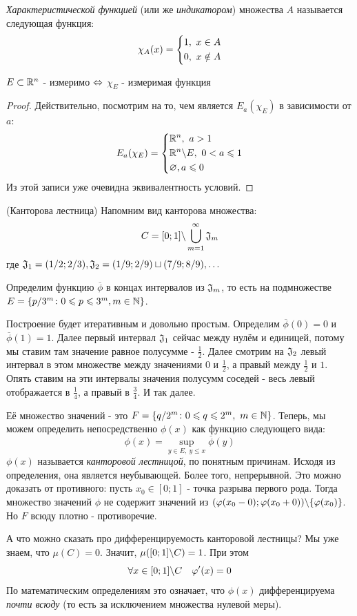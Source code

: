 \begin{definition}
	\textit{Характеристической функцией} (или же \textit{индикатором}) множества $A$ называется следующая функция:
	\[
		\chi_A(x) = \left\{\begin{aligned}
			&{1,\ x \in A}
			\\
			&{0,\ x \notin A}
		\end{aligned}\right.
	\]
\end{definition}

\begin{proposition}
	$E \subset \mathbb{R}^n$ - измеримо $\Leftrightarrow$ $\chi_E$ - измеримая функция
\end{proposition}

\begin{proof}
	Действительно, посмотрим на то, чем является $E_a(\chi_E)$ в зависимости от $a$:
	\[
		E_a(\chi_E) = \left\{\begin{aligned}
			&{\mathbb{R}^n,\ a > 1}
			\\
			&{\mathbb{R}^n \backslash E,\ 0 < a \leqslant 1}
			\\
			&{\varnothing, a \leqslant 0}
		\end{aligned}\right.
	\]
	Из этой записи уже очевидна эквивалентность условий.
\end{proof}

\begin{example} (Канторова лестница)
	Напомним вид канторова множества:
	\[
		C = [0; 1] \backslash \bigcup_{m = 1}^\infty \mathfrak{J}_m
	\]
	где $\mathfrak{J}_1 = (1/2; 2/3), \mathfrak{J}_2 = (1/9; 2/9) \sqcup (7/9; 8/9), \ldots$
	
	Определим функцию $\overline{\phi}$ в концах интервалов из $\mathfrak{J}_m$, то есть на подмножестве $E = \{p/3^m \colon 0 \leqslant p \leqslant 3^m, m \in \mathbb{N}\}$.
	
	Построение будет итеративным и довольно простым. Определим $\overline{\phi}(0) = 0$ и $\overline{\phi}(1) = 1$. Далее первый интервал $\mathfrak{J}_1$ сейчас между нулём и единицей, потому мы ставим там значение равное полусумме - $\frac{1}{2}$. Далее смотрим на $\mathfrak{J}_2$ левый интервал в этом множестве между значениями $0$ и $\frac{1}{2}$, а правый между $\frac{1}{2}$ и $1$. Опять ставим на эти интервалы значения полусумм соседей - весь левый отображается в $\frac{1}{4}$, а правый в $\frac{3}{4}$. И так далее.
	
	Её множество значений - это $F = \{q / 2^m \colon 0 \leqslant q \leqslant 2^m,\ m \in \mathbb{N}\}$. Теперь, мы можем определить непосредственно $\phi(x)$ как функцию следующего вида:
	\[
		\phi(x) = \sup_{y \in E,\ y \le x} \overline{\phi}(y)
	\]
	$\phi(x)$ называется \textit{канторовой лестницой}, по понятным причинам. Исходя из определения, она является неубывающей. Более того, непрерывной. Это можно доказать от противного: пусть $x_0 \in [0; 1]$ - точка разрыва первого рода. Тогда множество значений $\phi$ не содержит значений из $(\varphi(x_0 - 0); \varphi(x_0 + 0)) \backslash \{\varphi(x_0)\}$. Но $F$ всюду плотно - противоречие.
	
	А что можно сказать про дифференцируемость канторовой лестницы? Мы уже знаем, что $\mu(C) = 0$. Значит, $\mu([0; 1] \backslash C) = 1$. При этом
	\[
		\forall x \in [0; 1] \backslash C \quad \varphi'(x) = 0
	\]
	По математическим определениям это означает, что $\phi(x)$ дифференцируема \textit{почти всюду} (то есть за исключением множества нулевой меры).
\end{example}


